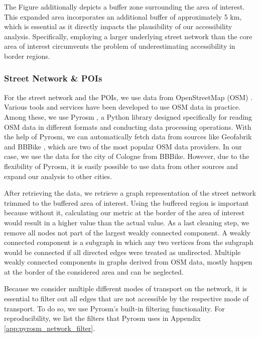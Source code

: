 The Figure additionally depicts a buffer zone surrounding the area of interest.
This expanded area incorporates an additional buffer of approximately 5 km, which is essential as it directly impacts the plausibility of our accessibility analysis.
Specifically, employing a larger underlying street network than the core area of interest circumvents the problem of underestimating accessibility in border regions.

\subsubsection{Street Network \& POIs}
\label{subs:street_network_pois}

For the street network and the POIs, we use data from OpenStreetMap (OSM) .
Various tools and services have been developed to use OSM data in practice.
Among these, we use Pyrosm , a Python library designed specifically for reading OSM data in different formats and conducting data processing operations.
With the help of Pyrosm, we can automatically fetch data from sources like Geofabrik  and BBBike \cite{schneiderBBBikeExtractsOpenStreetMap2023}, which are two of the most popular OSM data providers.
In our case, we use the data for the city of Cologne from BBBike.
However, due to the flexibility of Pyrosm, it is easily possible to use data from other sources and expand our analysis to other cities.

After retrieving the data, we retrieve a graph representation of the street network trimmed to the buffered area of interest.
Using the buffered region is important because without it, calculating our metric at the border of the area of interest would result in a higher value than the actual value.
As a last cleaning step, we remove all nodes not part of the largest weakly connected component.
A weakly connected component is a subgraph in which any two vertices from the subgraph would be connected if all directed edges were treated as undirected.
Multiple weakly connected components in graphs derived from OSM data, mostly happen at the border of the considered area and can be neglected.

Because we consider multiple different modes of transport on the network, it is essential to filter out all edges that are not accessible by the respective mode of transport.
To do so, we use Pyrosm's built-in filtering functionality.
For reproducibility, we list the filters that Pyrosm uses in Appendix \ref{app:pyrosm_network_filter}.

